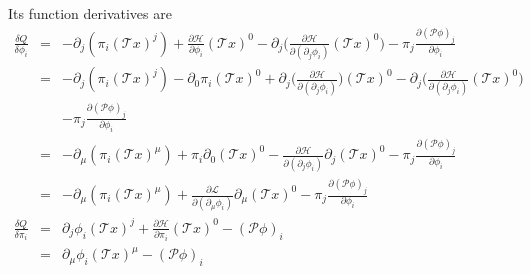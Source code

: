 \documentclass[12pt]{book}
\begin{document}
	Its function derivatives are
	\begin{eqnarray}
		\frac{\delta Q}{\delta \phi_i}&=&-\partial_j(\pi_i(\mathcal Tx)^j)+\frac{\partial \mathcal H}{\partial \phi_i}(\mathcal Tx)^0-\partial_j\Big(\frac{\partial \mathcal H}{\partial (\partial_j\phi_i)}(\mathcal Tx)^0\Big)-\pi_j\frac{\partial(\mathcal P\phi)_j}{\partial\phi_i} \\
		&=&-\partial_j(\pi_i(\mathcal Tx)^j)-\partial_0\pi_i(\mathcal Tx)^0+\partial_j\Big(\frac{\partial \mathcal H}{\partial (\partial_j\phi_i)}\Big)(\mathcal Tx)^0-\partial_j\Big(\frac{\partial \mathcal H}{\partial (\partial_j\phi_i)}(\mathcal Tx)^0\Big)\\
		&&-\pi_j\frac{\partial(\mathcal P\phi)_j}{\partial\phi_i}  \\
		&=&-\partial_\mu(\pi_i(\mathcal Tx)^\mu)+\pi_i\partial_0(\mathcal Tx)^0-\frac{\partial \mathcal H}{\partial (\partial_j\phi_i)}\partial_j(\mathcal Tx)^0-\pi_j\frac{\partial(\mathcal P\phi)_j}{\partial\phi_i}  \\
		&=&-\partial_\mu(\pi_i(\mathcal Tx)^\mu)+\frac{\partial \mathcal L}{\partial (\partial_\mu\phi_i)}\partial_\mu(\mathcal Tx)^0-\pi_j\frac{\partial(\mathcal P\phi)_j}{\partial\phi_i}  \\
		\frac{\delta Q}{\delta \pi_i}&=&\partial_j\phi_i(\mathcal Tx)^j+\frac{\partial \mathcal H}{\partial \pi_i}(\mathcal Tx)^0-(\mathcal P\phi)_i \\
		&=&\partial_\mu\phi_i(\mathcal Tx)^\mu-(\mathcal P\phi)_i
	\end{eqnarray}
	
\end{document}
